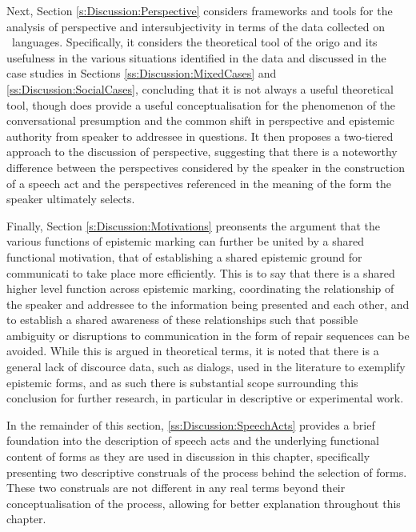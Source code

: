 Next, Section \ref{s:Discussion:Perspective} considers frameworks and tools for the analysis of perspective and intersubjectivity in terms of the data collected on \lfam\ languages. Specifically, it considers the theoretical tool of the origo and its usefulness in the various situations identified in the data and discussed in the case studies in Sections \ref{ss:Discussion:MixedCases} and \ref{ss:Discussion:SocialCases}, concluding that it is not always a useful theoretical tool, though does provide a useful conceptualisation for the phenomenon of the conversational presumption and the common shift in perspective and epistemic authority from speaker to addressee in questions. It then proposes a two-tiered approach to the discussion of perspective, suggesting that there is a noteworthy difference between the perspectives considered by the speaker in the construction of a speech act and the perspectives referenced in the meaning of the form the speaker ultimately selects.

Finally, Section \ref{s:Discussion:Motivations} preonsents the argument that the various functions of epistemic marking can further be united by a shared functional motivation, that of establishing a shared epistemic ground for communicati to take place more efficiently. This is to say that there is a shared higher level function across epistemic marking, coordinating the relationship of the speaker and addressee to the information being presented and each other, and to establish a shared awareness of these relationships such that possible ambiguity or disruptions to communication in the form of repair sequences can be avoided. While this is argued in theoretical terms, it is noted that there is a general lack of discource data, such as dialogs, used in the literature to exemplify epistemic forms, and as such there is substantial scope surrounding this conclusion for further research, in particular in descriptive or experimental work.

In the remainder of this section, \ref{ss:Discussion:SpeechActs} provides a brief foundation into the description of speech acts and the underlying functional content of forms as they are used in discussion in this chapter, specifically presenting two descriptive construals of the process behind the selection of forms. These two construals are not different in any real terms beyond their conceptualisation of the process, allowing for better explanation throughout this chapter.

